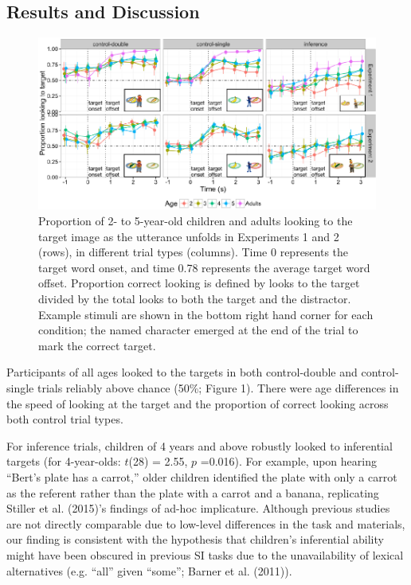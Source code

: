 \documentclass[a4paper,man,apacite,floatsintext]{apa6}
\newenvironment{CodeChunk}{}{}
\begin{document}
\subsection{Results and Discussion}\label{results-and-discussion}

\begin{CodeChunk}
\begin{figure}[H]

{\centering \includegraphics{figs/et_acc-1} 

}

\caption[Proportion of 2- to 5-year-old children and adults looking to the target image as the utterance unfolds in Experiments 1 and 2 (rows), in different trial types (columns)]{Proportion of 2- to 5-year-old children and adults looking to the target image as the utterance unfolds in Experiments 1 and 2 (rows), in different trial types (columns). Time 0 represents the target word onset, and time 0.78 represents the average target word offset. Proportion correct looking is defined by looks to the target divided by the total looks to both the target and the distractor. Example stimuli are shown in the bottom right hand corner for each condition; the named character emerged at the end of the trial to mark the correct target.}\label{fig:et_acc}
\end{figure}
\end{CodeChunk}

Participants of all ages looked to the targets in both control-double
and control-single trials reliably above chance (50\%; Figure 1). There
were age differences in the speed of looking at the target and the
proportion of correct looking across both control trial types.

For inference trials, children of 4 years and above robustly looked to
inferential targets (for 4-year-olds: \(t\)(28) = 2.55, \(p\) =0.016).
For example, upon hearing ``Bert's plate has a carrot,'' older children
identified the plate with only a carrot as the referent rather than the
plate with a carrot and a banana, replicating Stiller et al. (2015)'s
findings of ad-hoc implicature. Although previous studies are not
directly comparable due to low-level differences in the task and
materials, our finding is consistent with the hypothesis that children's
inferential ability might have been obscured in previous SI tasks due to
the unavailability of lexical alternatives (e.g. ``all'' given ``some'';
Barner et al. (2011)).
\end{document}
